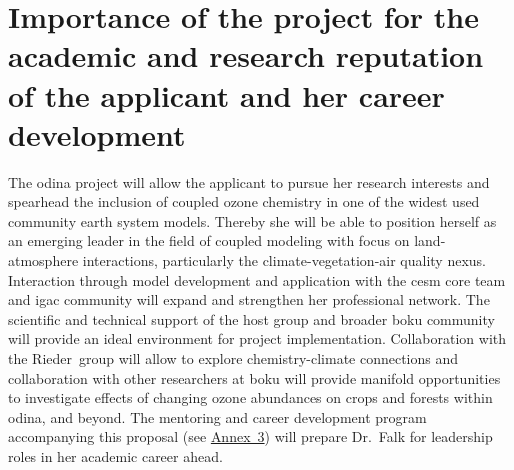 \section{Importance of the project for the academic and research reputation of the applicant and her career development}
The \gls{odina} project will allow the applicant to pursue her research interests and spearhead the inclusion of coupled ozone chemistry in one of the widest used community earth system models. Thereby she will be able to position herself as an emerging leader in the field of coupled modeling with focus on land-atmosphere interactions, particularly the climate-vegetation-air quality nexus. Interaction through model development and application with the \gls{cesm} core team and \gls{igac} community will expand and strengthen her professional network. The scientific and technical support of the host group and broader \gls{boku} community will provide an ideal environment for project implementation. Collaboration with the Rieder~group will allow to explore chemistry-climate connections and collaboration with other researchers at \gls{boku} will provide manifold opportunities to investigate effects of changing ozone abundances on crops and forests within \gls{odina}, and beyond. The mentoring and career development program accompanying this proposal (see \hyperref[appendix:career]{Annex~3}) will prepare Dr.~Falk for leadership roles in her academic career ahead.